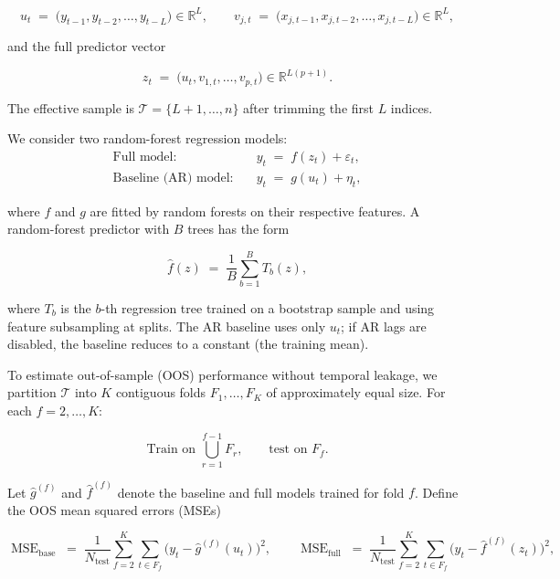 \documentclass[preprint, 3p,
authoryear]{elsarticle} %
\begin{document}
\begin{equation}
u_t \;=\; \big(y_{t-1},y_{t-2},\dots,y_{t-L}\big)\in\mathbb{R}^{L}, 
\qquad
v_{j,t} \;=\; \big(x_{j,t-1},x_{j,t-2},\dots,x_{j,t-L}\big)\in\mathbb{R}^{L},
\end{equation}

and the full predictor vector

\begin{equation}
z_t \;=\; \big(u_t, v_{1,t},\dots,v_{p,t}\big)\in \mathbb{R}^{L(p+1)}.
\end{equation}

The effective sample is \(\mathcal{T}=\{L+1,\dots,n\}\) after trimming
the first \(L\) indices.

We consider two random-forest regression models: \begin{align*}
\text{Full model:}\quad & y_t \;=\; f(z_t) + \varepsilon_t, \\
\text{Baseline (AR) model:}\quad & y_t \;=\; g(u_t) + \eta_t,
\end{align*}

\noindent where \(f\) and \(g\) are fitted by random forests on their
respective features. A random-forest predictor with \(B\) trees has the
form

\begin{equation}
\widehat f(z) \;=\; \frac{1}{B}\sum_{b=1}^B T_b(z),
\end{equation}

\noindent where \(T_b\) is the \(b\)-th regression tree trained on a
bootstrap sample and using feature subsampling at splits. The AR
baseline uses only \(u_t\); if AR lags are disabled, the baseline
reduces to a constant (the training mean).

To estimate out-of-sample (OOS) performance without temporal leakage, we
partition \(\mathcal{T}\) into \(K\) contiguous folds \(F_1,\dots,F_K\)
of approximately equal size. For each \(f=2,\dots,K\):

\begin{equation}
\text{Train on } \bigcup_{r=1}^{f-1} F_r, \qquad \text{test on } F_f.
\end{equation}

Let \(\widehat g^{(f)}\) and \(\widehat f^{(f)}\) denote the baseline
and full models trained for fold \(f\). Define the OOS mean squared
errors (MSEs)

\begin{equation}
\operatorname{MSE}_{\text{base}}
\;=\;
\frac{1}{N_{\text{test}}}\sum_{f=2}^K \sum_{t\in F_f}\big(y_t-\widehat g^{(f)}(u_t)\big)^2,
\qquad
\operatorname{MSE}_{\text{full}}
\;=\;
\frac{1}{N_{\text{test}}}\sum_{f=2}^K \sum_{t\in F_f}\big(y_t-\widehat f^{(f)}(z_t)\big)^2,
\end{equation}
\end{document}
